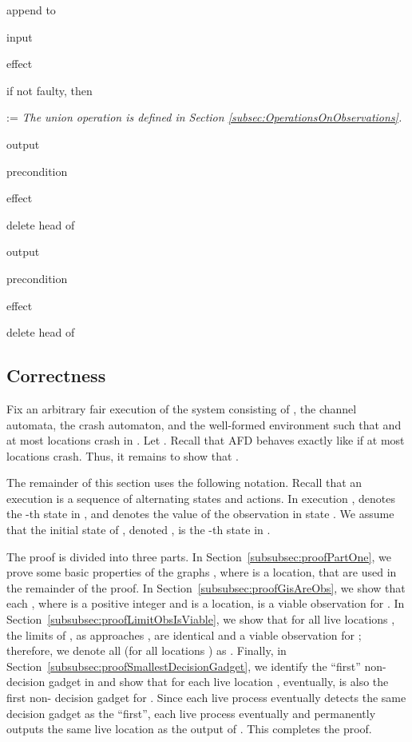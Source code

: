 \documentclass[11pt]{article}
\numberwithin{theorem}{section}
\newcommand{\tab}{\hspace{5mm}}
\begin{document}
\begin{algorithm}
\tab \tab \tab append  to 


\tab

\tab input 

\tab effect

\tab \tab if not faulty, then

\tab \tab \tab  := \hfill \emph{The union operation is defined in Section \ref{subsec:OperationsOnObservations}.}


\tab

\tab output 

\tab precondition

\tab \tab 

\tab effect

\tab \tab delete head of 



\tab

\tab output 

\tab precondition

\tab \tab  

\tab effect

\tab \tab delete head of 

\end{algorithm}


\subsection{Correctness}
\label{subsec:omegaExtractionCorrectness}



Fix an arbitrary fair execution  of the system consisting of
, the channel automata, the crash automaton, and the
well-formed environment  such that  and at most  locations crash in . Let
. Recall that AFD  behaves
exactly like  if at most  locations crash.
Thus, it remains to show that .
 
 
 The remainder of this section uses the following notation. Recall
 that an execution is a sequence of alternating states and actions. In
 execution ,  denotes the -th state in
 , and  denotes the value of the observation
  in state . We assume that the initial state of , denoted , is the -th state in .
 
 The proof is divided into three parts. 
In Section~\ref{subsubsec:proofPartOne}, we prove some basic properties of
the graphs , where  is a location, that are used in the
remainder of the proof. 
In Section~\ref{subsubsec:proofGisAreObs}, we show that each
, where  is a positive integer and  is a
location, is a viable observation for .
In Section~\ref{subsubsec:proofLimitObsIsViable}, we show that for all
live locations , the limits  of , as 
approaches , are identical and a viable observation for
; therefore, we denote all  (for all locations ) as . 
Finally, in Section~\ref{subsubsec:proofSmallestDecisionGadget}, we
identify the ``first'' non- decision gadget  in  and show that
for each live location , eventually,  is also the first
non- decision gadget for . 
Since each live process eventually detects the same decision gadget as
the ``first'', each live process eventually and permanently outputs
the same live location as the output of
. This completes the proof. 
  
\end{document}

